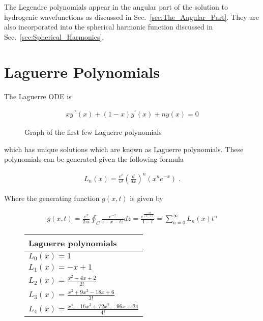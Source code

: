         \noindent The Legendre polynomials appear in the angular part of the solution to hydrogenic wavefunctions as discussed in Sec.~\ref{sec:The_Angular_Part}. They are also incorporated into the spherical harmonic function discussed in Sec.~\ref{sec:Spherical_Harmonics}.

        \section{Laguerre Polynomials} \label{sec:Laguerre_Polynomial}
        The Laguerre ODE is 

        \begin{align}
            xy^{\prime \prime}(x) + (1 - x)y^\prime(x) + ny(x) = 0 
        \end{align}


        \begin{figure}[h]
            \centering
            \resizebox{0.8\linewidth}{!}{}
            \caption{Graph of the first few Laguerre polynomials}
            \label{img:Laguerre_polynomials}
        \end{figure}

        \noindent which has unique solutions which are known as Laguerre polynomials. These polynomials can be generated given the following formula 

        \begin{align}
            L_n(x) = \frac{e^x}{n!} \left( \frac{d}{dx} \right)^n (x^ne^{-x})\;.
        \end{align}

        \noindent Where the generating function $g(x, t)$ is given by \cite{Arfken_Weber_Arfken_Weber_2008}

        \begin{align}
            g(x, t) = \frac{e^x}{2\pi i} \oint_C \frac{e^{-z}}{z - x - tz} dz = \frac{e^{\frac{-xt}{(1 - t)}}}{1 - t} = \sum_{n = 0}^\infty L_n(x) t^n
        \end{align}

        \begin{figure}
            \centering 
            \begin{tabular}{l}
                Laguerre polynomials\\
                \hline 
                $L_0(x) = 1$\\
                $L_1(x) = -x + 1$\\
                $L_2(x) = \frac{x^2 - 4x + 2}{2!}$\\
                $L_3(x) = \frac{x^3 + 9x^2 - 18x + 6}{3!}$\\
                $L_4(x) = \frac{x^4 - 16x^3 + 72x^2 - 96x + 24}{4!}$\\
                \hline
            \end{tabular}
        \end{figure}

